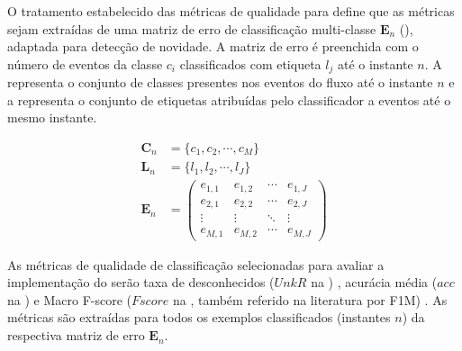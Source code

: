 O tratamento estabelecido das métricas de qualidade para \streamMining define
que as métricas sejam extraídas de uma matriz de erro de classificação
multi-classe $\mathbf{E}_n$ (), adaptada para detecção de
novidade.
A matriz de erro é preenchida com o número de eventos da classe $c_i$ classificados com
etiqueta $l_j$ até o instante $n$.
A  representa o conjunto de classes presentes nos eventos
do fluxo até o instante $n$ e a  representa o conjunto
de etiquetas atribuídas pelo classificador a eventos até o mesmo instante.

\begin{align}
  \mathbf{C}_n &= \{ c_1, c_2, \cdots, c_M \}  \label{eq:classes} \\
  \mathbf{L}_n &= \{ l_1, l_2, \cdots, l_J \}  \label{eq:labels} \\
  \mathbf{E}_n &= \begin{pmatrix}
    e_{1,1} & e_{1,2} & \cdots & e_{1,J} \\
    e_{2,1} & e_{2,2} & \cdots & e_{2,J} \\
    \vdots  & \vdots  & \ddots & \vdots  \\
    e_{M,1} & e_{M,2} & \cdots & e_{M,J} 
  \end{pmatrix}  \label{eq:matrix}
\end{align}

As métricas de qualidade de classificação selecionadas para avaliar a
implementação do \mfog serão
taxa de desconhecidos ($UnkR$ na ) \cite{Faria2013},
acurácia média ($acc$ na )
e Macro F-score ($Fscore$ na , também referido na literatura por
F1M) \cite{Sokolova2009,DaSilva2018thesis}.
As métricas são extraídas para todos os exemplos classificados (instantes $n$)
da respectiva matriz de erro $\mathbf{E}_n$.



